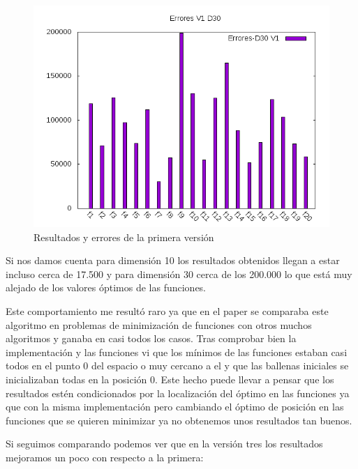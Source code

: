 \documentclass[12pt,a4paper]{article}
\begin{document}
\begin{figure}[!h]
		\includegraphics[scale=0.5]{../Algoritmo/resultados/Imagenes/Errores/errores_v1_d30.png}
		\caption{Resultados y errores de la primera versión}
	\end{figure}

	Si nos damos cuenta para dimensión 10 los resultados obtenidos llegan a estar incluso cerca de 17.500 y para dimensión 30 cerca de los 200.000 lo que está muy alejado de los valores óptimos de las funciones. 
	
	Este comportamiento me resultó raro ya que en el paper se comparaba este algoritmo en problemas de minimización de funciones con otros muchos algoritmos y ganaba en casi todos los casos. Tras comprobar bien la implementación y las funciones vi que los mínimos de las funciones estaban casi todos en el punto 0 del espacio o muy cercano a el y que las ballenas iniciales se inicializaban todas en la posición 0. Este hecho puede llevar a pensar que los resultados estén condicionados por la localización del óptimo en las funciones ya que con la misma implementación pero cambiando el óptimo de posición en las funciones que se quieren minimizar ya no obtenemos unos resultados tan buenos.
	
	Si seguimos comparando podemos ver que en la versión tres los resultados mejoramos un poco con respecto a la primera:
	
\end{document}
